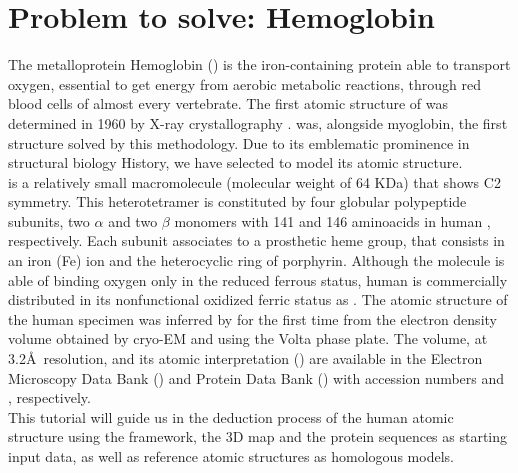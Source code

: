 
\section{Problem to solve: Hemoglobin}

The metalloprotein Hemoglobin () is the iron-containing protein able to transport oxygen, essential to get energy from aerobic metabolic reactions, through red blood cells of almost every vertebrate. The first atomic structure of  was determined in 1960 by X-ray crystallography \citep{perutz1960}.  was, alongside myoglobin, the first structure solved by this methodology. Due to its emblematic prominence in structural biology History, we have selected  to model its atomic structure.\\

 is a relatively small macromolecule (molecular weight of 64 KDa) that shows C2 symmetry. This heterotetramer is constituted by four globular polypeptide subunits, two $\alpha$ and two $\beta$ monomers with 141 and 146 aminoacids in human , respectively. Each subunit associates to a prosthetic heme group, that consists in an iron (Fe) ion and the heterocyclic ring of porphyrin. Although the molecule is able of binding oxygen only in the reduced ferrous status, human  is commercially distributed in its nonfunctional oxidized ferric status as . The atomic structure of the human  specimen was inferred by \citet{khoshouei2017} for the first time from the electron density volume obtained by cryo-EM and using the Volta phase plate. The volume, at 3.2\AA\ resolution, and its atomic interpretation () are available in the Electron Microscopy Data Bank () and Protein Data Bank () with accession numbers  and , respectively.\\

This tutorial will guide us in the deduction process of the human  atomic structure using the \scipion framework, the 3D map and the protein sequences as starting input data, as well as reference atomic structures as homologous models. %
